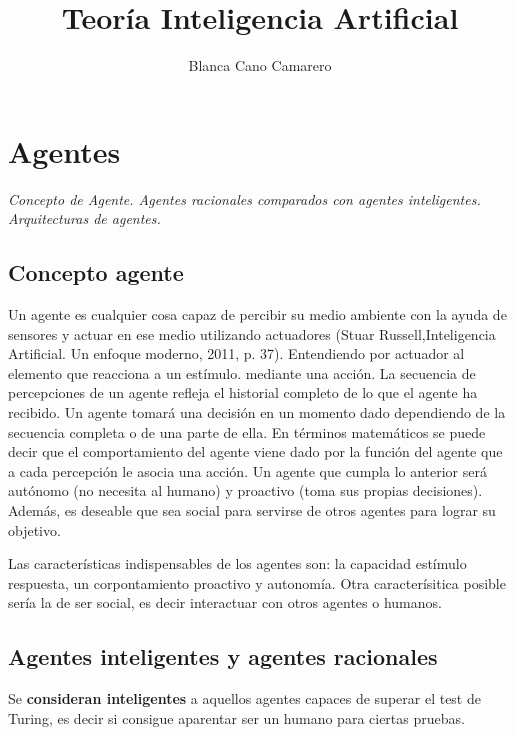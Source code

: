 \documentclass[12 pt, a4paper]{article}
\title{Teoría Inteligencia Artificial}
\author{Blanca Cano Camarero}
\begin{document}
\begin{titlepage}
\maketitle
\tableofcontents

\end{titlepage}




\section{Agentes}
    \textit{Concepto de Agente. Agentes racionales comparados con  agentes inteligentes. Arquitecturas de agentes.}

\subsection{Concepto agente}

Un agente es cualquier cosa capaz de percibir su medio ambiente con la ayuda de sensores 
y actuar en ese medio utilizando actuadores (Stuar Russell,Inteligencia Artificial. Un enfoque moderno, 2011, p. 37).
Entendiendo por actuador al elemento que reacciona a un estímulo. 
mediante una acción. La secuencia de percepciones de un agente refleja el historial 
completo de lo que el agente ha recibido. Un agente tomará una decisión en un momento dado
 dependiendo de la secuencia completa 
o de una parte de ella. En términos matemáticos se puede decir que el comportamiento del 
agente viene dado por la función del agente que a cada percepción le asocia una acción. 
Un agente que cumpla lo anterior será autónomo (no necesita al humano) y proactivo (toma sus
 propias decisiones). Además, es deseable que sea social para servirse de otros agentes para
  lograr su objetivo.

Las características indispensables de los agentes son: la capacidad estímulo respuesta, 
un corpontamiento proactivo y autonomía. Otra caracterísitica posible 
sería la de ser social, es decir interactuar con otros agentes o humanos. 



\subsection{ Agentes inteligentes y agentes racionales}  

Se \textbf{consideran inteligentes} a aquellos agentes capaces de superar el test de Turing, es decir si consigue
 aparentar ser un humano para ciertas pruebas. \paragraph{}
\end{document}
